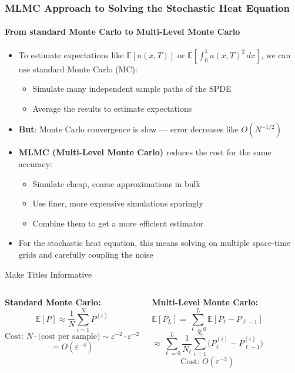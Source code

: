 \documentclass[aspectratio=169]{beamer}
\begin{document}
\begin{frame}
  \frametitle{MLMC Approach to Solving the Stochastic Heat Equation}
  \framesubtitle{From standard Monte Carlo to Multi-Level Monte Carlo}

  \begin{itemize}
    \item To estimate expectations like \( \mathbb{E}[u(x,T)] \) or \( \mathbb{E}\left[\int_0^1 u(x,T)^2 \, dx\right] \), we can use standard Monte Carlo (MC):
    \begin{itemize}
      \item Simulate many independent sample paths of the SPDE
      \item Average the results to estimate expectations
    \end{itemize}

    \pause

    \item \textbf{But}: Monte Carlo convergence is slow — error decreases like \( O(N^{-1/2}) \)

    \pause

    \item \textbf{MLMC (Multi-Level Monte Carlo)} reduces the cost for the same accuracy:
    \begin{itemize}
      \item Simulate cheap, coarse approximations in bulk
      \item Use finer, more expensive simulations sparingly
      \item Combine them to get a more efficient estimator
    \end{itemize}

    \pause

    \item For the stochastic heat equation, this means solving on multiple space-time grids and carefully coupling the noise
  \end{itemize}
\end{frame}

\begin{frame}{Make Titles Informative}
  
\begin{columns}

  \textbf{Standard Monte Carlo:}
  \[
    \mathbb{E}[P] \approx \frac{1}{N} \sum_{i=1}^N P^{(i)}
  \]
  \[
    \text{Cost: } N \cdot \text{(cost per sample)} \sim \varepsilon^{-2} \cdot \varepsilon^{-2}
  \]
  \[
    = \boxed{O(\varepsilon^{-4})}
  \]

  \vspace{1em}

  \textbf{Multi-Level Monte Carlo:}
  \[
    \mathbb{E}[P_L] = \sum_{\ell=0}^L \mathbb{E}[P_\ell - P_{\ell-1}]
  \]
  \[
    \approx \sum_{\ell=0}^L \frac{1}{N_\ell} \sum_{i=1}^{N_\ell} 
    \big( P_\ell^{(i)} - P_{\ell-1}^{(i)} \big)
  \]
  \[
    \text{Cost: } \boxed{O(\varepsilon^{-2})}
  \]
\end{columns}
\end{frame}
\end{document}
